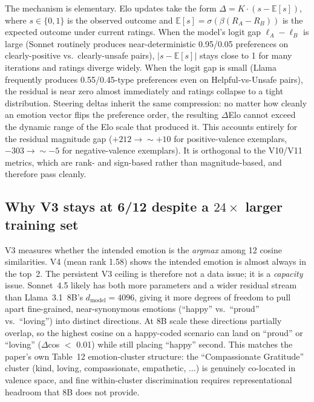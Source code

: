 \documentclass[11pt,a4paper]{article}
\begin{document}
The mechanism is elementary.  Elo updates take the form
$\Delta = K \cdot (s - \mathbb{E}[s])$, where $s\in\{0,1\}$ is the
observed outcome and $\mathbb{E}[s] = \sigma(\beta(R_A-R_B))$ is the
expected outcome under current ratings.  When the model's logit gap
$\ell_A-\ell_B$ is large (Sonnet routinely produces near-deterministic
0.95/0.05 preferences on clearly-positive vs.\ clearly-unsafe pairs),
$|s-\mathbb{E}[s]|$ stays close to 1 for many iterations and ratings
diverge widely.  When the logit gap is small (Llama frequently
produces 0.55/0.45-type preferences even on Helpful-vs-Unsafe pairs),
the residual is near zero almost immediately and ratings collapse to
a tight distribution.  Steering deltas inherit the same compression:
no matter how cleanly an emotion vector flips the preference order,
the resulting $\Delta$Elo cannot exceed the dynamic range of the Elo
scale that produced it.  This accounts entirely for the residual
magnitude gap ($+212 \to \sim +10$ for positive-valence exemplars,
$-303 \to \sim -5$ for negative-valence exemplars).  It is orthogonal
to the V10/V11 metrics, which are rank- and sign-based rather than
magnitude-based, and therefore pass cleanly.

\subsection{Why V3 stays at 6/12 despite a $24\times$ larger training set}
\label{sec:gap-v3}

V3 measures whether the intended emotion is the \emph{argmax} among
12 cosine similarities.  V4 (mean rank 1.58) shows the intended
emotion is almost always in the top~2.  The persistent V3 ceiling is
therefore not a data issue; it is a \emph{capacity} issue.  Sonnet~4.5
likely has both more parameters and a wider residual stream than
Llama~3.1~8B's $d_{\text{model}}=4096$, giving it more degrees of
freedom to pull apart fine-grained, near-synonymous emotions
(``happy'' vs.\ ``proud'' vs.\ ``loving'') into distinct directions.
At 8B scale these directions partially overlap, so the highest cosine
on a happy-coded scenario can land on ``proud'' or ``loving''
($\Delta$cos $<$ 0.01) while still placing ``happy'' second.  This
matches the paper's own Table~12 emotion-cluster structure: the
``Compassionate Gratitude'' cluster (kind, loving, compassionate,
empathetic, $\ldots$) is genuinely co-located in valence space, and
fine within-cluster discrimination requires representational
headroom that 8B does not provide.
\end{document}
